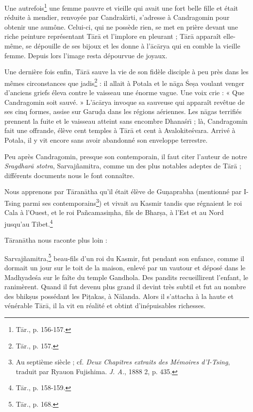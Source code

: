 \documentclass[a4paper, 11pt, oneside, french]{article}
\begin{document}
Une autrefois\footnote{T\={a}r., p. 156-157.} une femme pauvre et vieille qui avait une fort belle fille et était réduite à mendier, renvoyée par Candrak\={\i}rti, s'adresse à Candragomin pour obtenir une aumône. Celui-ci, qui ne possède rien, se met en prière devant une riche peinture représentant T\={a}r\={a} et l'implore en pleurant ; T\={a}r\={a} apparaît elle-même, se dépouille de ses bijoux et les donne à l'\={a}c\={a}rya qui en comble la vieille femme. Depuis lors l'image resta dépourvue de joyaux.

Une dernière fois enfin, T\={a}r\={a} sauve la vie de son fidèle disciple à peu près dans les mêmes circonstances que jadis\footnote{T\={a}r., p. 157.} : il allait à Potala et le n\={a}ga \'{S}e\d{s}a voulant venger d'anciens griefs éleva contre le vaisseau une énorme vague. Une voix crie : « Que Candragomin soit sauvé. » L'\={a}c\={a}rya invoque sa sauveuse qui apparaît revêtue de ses cinq formes, assise sur Garu\d{d}a dans les régions aériennes. Les n\={a}gas terrifiés prennent la fuite et le vaisseau atteint sans encombre Dhana\'{s}r\={\i} ; là, Candragomin fait une offrande, élève cent temples à T\={a}r\={a} et cent à Avalokite\'{s}vara. Arrivé à Potala, il y vit encore sans avoir abandonné son enveloppe terrestre.

Peu après Candragomin, presque son contemporain, il faut citer l'auteur de notre \emph{Sragdhar\={a} stotra}, Sarvaj\~{n}amitra, comme un des plus notables adeptes de T\={a}r\={a} ; différents documents nous le font connaître.

Nous apprenons par T\={a}ran\={a}tha qu'il était élève de Gu\d{n}aprabha (mentionné par I-Tsing parmi ses contemporains\footnote{Au septième siècle ; cf. \emph{Deux Chapitres extraits des Mémoires d'I-Tsing}, traduit par Ryauon Fujishima. \emph{J. A.}, 1888 2, p. 435.}) et vivait au Kasmir tandis que régnaient le roi Cala à l'Ouest, et le roi Pa\~{n}camasi\d{m}ha, fils de Bhar\d{s}a, à l'Est et au Nord jusqu'au Tibet.\footnote{T\={a}r., p. 158-159.}

T\={a}ran\={a}tha nous raconte plus loin :

Sarvaj\~{n}amitra,\footnote{T\={a}r., p. 168.} beau-fils d'un roi du Kasmir, fut pendant son enfance, comme il dormait un jour sur le toit de la maison, enlevé par un vautour et déposé dans le Madhyade\'{s}a sur le faîte du temple Gandhola. Des pandits recueillirent l'enfant, le ranimèrent. Quand il fut devenu plus grand il devint très subtil et fut au nombre des bhik\d{s}us possédant les Pi\d{t}akas, à N\={a}landa. Alors il s'attacha à la haute et vénérable T\={a}r\={a}, il la vit en réalité et obtint d'inépuisables richesses.
\end{document}
